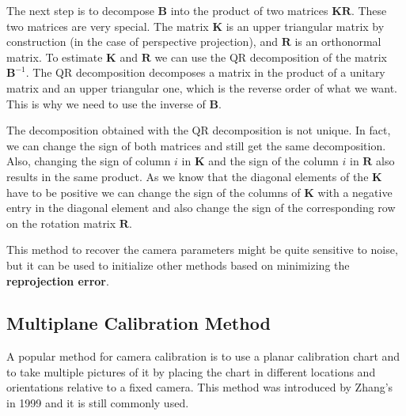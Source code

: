 The next step is to decompose $\mathbf{B}$ into the product of two matrices $\mathbf{K}\mathbf{R}$. These two matrices are very special. The matrix $\mathbf{K}$ is an upper triangular matrix by construction (in the case of perspective projection), and $\mathbf{R}$ is an orthonormal matrix. 
To estimate $\mathbf{K}$ and $\mathbf{R}$ we can use the QR decomposition of the matrix $\mathbf{B}^{-1}$. The QR decomposition decomposes a matrix in the product of a unitary matrix and an upper triangular one, which is the reverse order of what we want. This is why we need to use the inverse of $\mathbf{B}$.

The decomposition obtained with the QR decomposition is not unique. In fact, we can change the sign of both matrices and still get the same decomposition. Also, changing the sign of column $i$ in $\mathbf{K}$ and the sign of the column $i$ in $\mathbf{R}$ also results in the same product.  As we know that the diagonal elements of the $\mathbf{K}$ have to be positive we can change the sign of the columns of $\mathbf{K}$  with a negative entry in the diagonal element and also change the sign of the corresponding row on the rotation matrix $\mathbf{R}$.


This method to recover the camera parameters might be quite sensitive to noise, but it can be used to initialize other methods based on minimizing the {\bf reprojection error}. 

\subsection{Multiplane Calibration Method}

A popular method for camera calibration is to use a planar calibration chart and to take multiple pictures of it by placing the chart in different locations and orientations relative to a fixed camera. This method was introduced by Zhang’s in 1999 \cite{Zhang1999} and it is still commonly used. 



